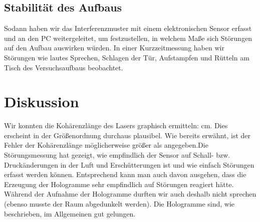 \documentclass[10pt,a4paper]{article}
\begin{document}
\subsection{Stabilität des Aufbaus}

Sodann haben wir das Interferenzmuster mit einem elektronischen Sensor erfasst und an den PC weitergeleitet, um festzustellen, in welchem Maße sich Störungen auf den Aufbau auswirken würden. In einer Kurzzeitmessung haben wir Störungen wie lautes Sprechen, Schlagen der Tür, Aufstampfen und Rütteln am Tisch des Versuchsaufbaus beobachtet.

\section{Diskussion}

Wir konnten die Kohärenzlänge des Lasers graphisch ermitteln:   cm. Dies erscheint in der Größenordnung durchaus plausibel. Wie bereits erwähnt, ist der Fehler der Kohärenzlänge möglicherweise größer als angegeben.Die Störungsmessung hat gezeigt, wie empfindlich der Sensor auf Schall- bzw. Druckänderungen in der Luft und Erschütterungen ist und wie einfach Störungen erfasst werden können. Entsprechend kann man auch davon ausgehen, dass die Erzeugung der Hologramme sehr empfindlich auf Störungen reagiert hätte. Während der Aufnahme der Hologramme durften wir auch deshalb nicht sprechen (ebenso musste der Raum abgedunkelt werden). Die Hologramme sind, wie beschrieben, im Allgemeinen gut gelungen.
\end{document}

